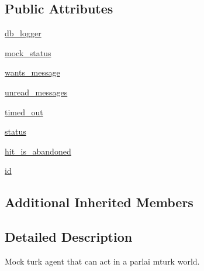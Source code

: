 \subsection*{Public Attributes}
\begin{DoxyCompactItemize}
\item 
\hyperlink{classparlai_1_1mturk_1_1webapp_1_1run__mocks_1_1mock__turk__agent_1_1MockTurkAgent_af5b22167ce7c695856bd9dac6c0fdd4f}{db\+\_\+logger}
\item 
\hyperlink{classparlai_1_1mturk_1_1webapp_1_1run__mocks_1_1mock__turk__agent_1_1MockTurkAgent_a7611391e84274d3980db9d567db13ae9}{mock\+\_\+status}
\item 
\hyperlink{classparlai_1_1mturk_1_1webapp_1_1run__mocks_1_1mock__turk__agent_1_1MockTurkAgent_a9aefbba229f0b0df3d267cad88df15e5}{wants\+\_\+message}
\item 
\hyperlink{classparlai_1_1mturk_1_1webapp_1_1run__mocks_1_1mock__turk__agent_1_1MockTurkAgent_afd7b0a0daee5029fa5ceb102d2f809f2}{unread\+\_\+messages}
\item 
\hyperlink{classparlai_1_1mturk_1_1webapp_1_1run__mocks_1_1mock__turk__agent_1_1MockTurkAgent_a428a987df6d32cfbdc591bec133b66ee}{timed\+\_\+out}
\item 
\hyperlink{classparlai_1_1mturk_1_1webapp_1_1run__mocks_1_1mock__turk__agent_1_1MockTurkAgent_ae796b9f8111dc43c24bc5e564e0dccbb}{status}
\item 
\hyperlink{classparlai_1_1mturk_1_1webapp_1_1run__mocks_1_1mock__turk__agent_1_1MockTurkAgent_ae12cfc5dc9bf903588e2bb5f9989ede4}{hit\+\_\+is\+\_\+abandoned}
\item 
\hyperlink{classparlai_1_1mturk_1_1webapp_1_1run__mocks_1_1mock__turk__agent_1_1MockTurkAgent_a1a099ffc00a93cdf9e8bd4b559737951}{id}
\end{DoxyCompactItemize}
\subsection*{Additional Inherited Members}


\subsection{Detailed Description}
\begin{DoxyVerb}Mock turk agent that can act in a parlai mturk world.
\end{DoxyVerb}
 

